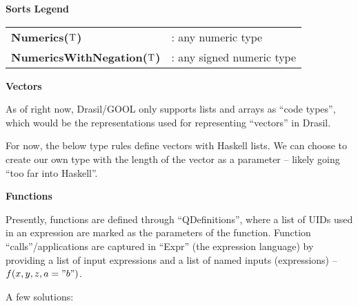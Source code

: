 \begin{center}
    \textbf{Sorts Legend}
    \begin{tabular}{ l l }
        \textbf{Numerics($\mathrm{T}$)} &: any numeric type \\
        \textbf{NumericsWithNegation($\mathrm{T}$)} &: any signed numeric type
    \end{tabular}
    
\end{center}

\textbf{Vectors}

As of right now, Drasil/GOOL only supports lists and arrays as ``code types'', 
which would be the representations used for representing ``vectors'' in Drasil.


For now, the below type rules define vectors with Haskell lists. We can choose to
create our own type with the length of the vector as a parameter -- likely going
``too far into Haskell''.

\textbf{Functions}

Presently, functions are defined through ``QDefinitions'', where a list of
UIDs used in an expression are marked as the parameters of the function. Function
``calls''/applications are captured in ``Expr'' (the expression language) by
providing a list of input expressions and a list of named inputs (expressions) -- 
$f(x,y,z,a="b")$.



A few solutions:

